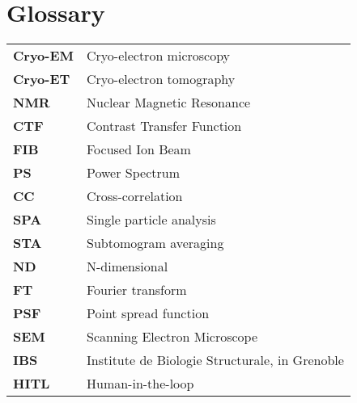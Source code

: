 \chapter{Glossary}


\begin{tabularx}{\linewidth}{@{}>{\bfseries}l X} %
Cryo-EM & Cryo-electron microscopy \\
Cryo-ET & Cryo-electron tomography \\
NMR & Nuclear Magnetic Resonance \\
CTF & Contrast Transfer Function \\
FIB & Focused Ion Beam \\
PS & Power Spectrum \\
CC & Cross-correlation \\
SPA & Single particle analysis \\
STA & Subtomogram averaging \\
ND & N-dimensional \\
FT & Fourier transform \\
PSF & Point spread function \\
SEM & Scanning Electron Microscope \\
IBS & Institute de Biologie Structurale, in Grenoble \\
HITL & Human-in-the-loop \\
\end{tabularx}


